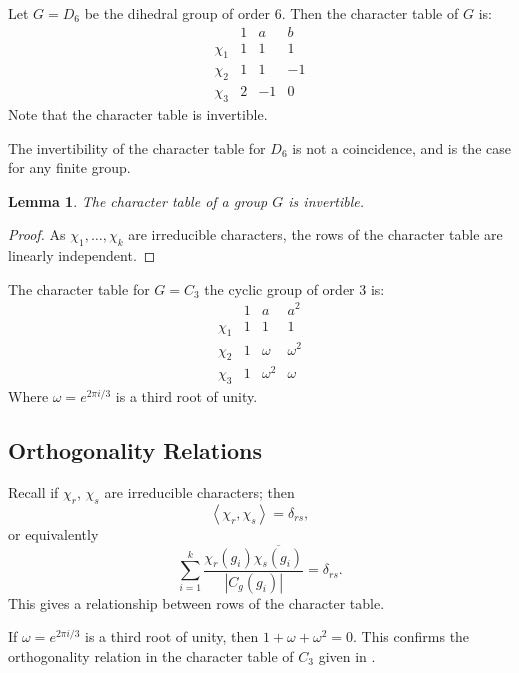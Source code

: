 \documentclass[11pt, notitlepage]{article}
\numberwithin{equation}{section}
\theoremstyle{plain}
\newtheorem{lemma}[theorem]{Lemma}
\theoremstyle{definition}
\newenvironment{example}
	{\pushQED{\qed}\renewcommand{\qedsymbol}{$\blacktriangleleft$}\examplex}
	{\popQED\endexamplex}
\newcommand{\inner}[2]{\left\langle #1,#2 \right\rangle}
\begin{document}
\begin{example}
Let $G = D_6$ be the dihedral group of order 6. Then the character table of $G$ is:
\[
    \begin{array}{c|rrr}
               & 1 & a  & b \\\hline
        \chi_1 & 1 & 1  & 1 \\
        \chi_2 & 1 & 1  & -1\\
        \chi_3 & 2 & -1 & 0
    \end{array}
\]
Note that the character table is invertible.
\end{example}

The invertibility of the character table for $D_6$ is not a coincidence, and is the case for any finite group.

\begin{lemma}
The character table of a group $G$ is invertible.
\end{lemma}

\begin{proof}
As $\chi_1,\dots,\chi_k$ are irreducible characters, the rows of the character table are linearly independent.
\end{proof}

\begin{example}
The character table for $G = C_3$ the cyclic group of order 3 is:
\[
    \begin{array}{c|lll}
               & 1 & a        & a^2  \\\hline
        \chi_1 & 1 &    1     & 1 \\
        \chi_2 & 1 & \omega   & \omega^2\\
        \chi_3 & 1 & \omega^2 & \omega
    \end{array}
\]
Where $\omega = e^{2\pi i/3}$ is a third root of unity.
\end{example}



\subsection{Orthogonality Relations}


Recall if $\chi_r$, $\chi_s$ are irreducible characters; then
\[
    \inner{\chi_r}{\chi_s} = \delta_{rs},
\]
or equivalently
\[
    \sum_{i=1}^k \frac{\chi_r(g_i)\overline{\chi_s(g_i)}}{|C_g(g_i)|} = \delta_{rs}.
\]
This gives a relationship between rows of the character table.

\begin{example}
If $\omega = e^{2\pi i/3}$ is a third root of unity, then $1 + \omega + \omega^2 = 0$. This confirms the orthogonality relation in the character table of $C_3$ given in .
\end{example}
\end{document}
